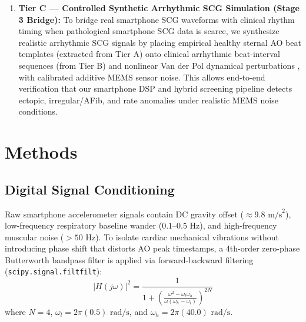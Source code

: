 \begin{enumerate}
\begin{itemize}
	\end{itemize}
	\item \textbf{Tier C --- Controlled Synthetic Arrhythmic SCG Simulation (Stage 3 Bridge):} To bridge real smartphone SCG waveforms with clinical rhythm timing when pathological smartphone SCG data is scarce, we synthesize realistic arrhythmic SCG signals by placing empirical healthy sternal AO beat templates (extracted from Tier A) onto clinical arrhythmic beat-interval sequences (from Tier B) and nonlinear Van der Pol dynamical perturbations \cite{vanderpol1928, quiroz2018cardiac}, with calibrated additive MEMS sensor noise. This allows end-to-end verification that our smartphone DSP and hybrid screening pipeline detects ectopic, irregular/AFib, and rate anomalies under realistic MEMS noise conditions.
\end{enumerate}

\section{Methods}

\subsection{Digital Signal Conditioning}
Raw smartphone accelerometer signals contain DC gravity offset ($\approx 9.8\text{ m/s}^2$), low-frequency respiratory baseline wander ($0.1\text{--}0.5\text{ Hz}$), and high-frequency muscular noise ($> 50\text{ Hz}$). To isolate cardiac mechanical vibrations without introducing phase shift that distorts AO peak timestamps, a 4th-order zero-phase Butterworth bandpass filter \cite{butterworth1930theory} is applied via forward-backward filtering (\texttt{scipy.signal.filtfilt}):
\begin{equation}
	|H(j\omega)|^2 = \frac{1}{1 + \left(\frac{\omega^2 - \omega_l \omega_h}{\omega(\omega_h - \omega_l)}\right)^{2N}}
\end{equation}
where $N=4$, $\omega_l = 2\pi(0.5)\text{ rad/s}$, and $\omega_h = 2\pi(40.0)\text{ rad/s}$.


